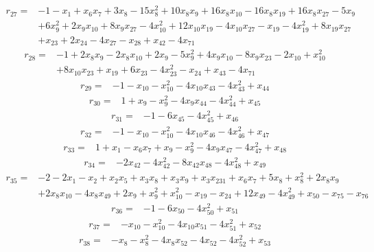 \[\begin{aligned}
r_{27}={}&-1-x_{1}+x_{6}x_{7}+3x_{8}-15x_{8}^{2}+10x_{8}x_{9}+16x_{8}x_{10}-16x_{8}x_{19}+16x_{8}x_{27}-5x_{9}
\\ &+6x_{9}^{2}+2x_{9}x_{10}+8x_{9}x_{27}-4x_{10}^{2}+12x_{10}x_{19}-4x_{10}x_{27}-x_{19}-4x_{19}^{2}+8x_{19}x_{27}
\\ &+x_{23}+2x_{24}-4x_{27}-x_{28}+x_{42}-4x_{71}
\end{aligned}\]
\[\begin{aligned}
r_{28}={}&-1+2x_{8}x_{9}-2x_{8}x_{10}+2x_{9}-5x_{9}^{2}+4x_{9}x_{10}-8x_{9}x_{23}-2x_{10}+x_{10}^{2}
\\ &+8x_{10}x_{23}+x_{19}+6x_{23}-4x_{23}^{2}-x_{24}+x_{43}-4x_{71}
\end{aligned}\]
\[\begin{aligned}
r_{29}={}&-1-x_{10}-x_{10}^{2}-4x_{10}x_{43}-4x_{43}^{2}+x_{44}
\end{aligned}\]
\[\begin{aligned}
r_{30}={}&1+x_{9}-x_{9}^{2}-4x_{9}x_{44}-4x_{44}^{2}+x_{45}
\end{aligned}\]
\[\begin{aligned}
r_{31}={}&-1-6x_{45}-4x_{45}^{2}+x_{46}
\end{aligned}\]
\[\begin{aligned}
r_{32}={}&-1-x_{10}-x_{10}^{2}-4x_{10}x_{46}-4x_{46}^{2}+x_{47}
\end{aligned}\]
\[\begin{aligned}
r_{33}={}&1+x_{1}-x_{6}x_{7}+x_{9}-x_{9}^{2}-4x_{9}x_{47}-4x_{47}^{2}+x_{48}
\end{aligned}\]
\[\begin{aligned}
r_{34}={}&-2x_{42}-4x_{42}^{2}-8x_{42}x_{48}-4x_{48}^{2}+x_{49}
\end{aligned}\]
\[\begin{aligned}
r_{35}={}&-2-2x_{1}-x_{2}+x_{2}x_{5}+x_{3}x_{8}+x_{3}x_{9}+x_{3}x_{231}+x_{6}x_{7}+5x_{8}+x_{8}^{2}+2x_{8}x_{9}
\\ &+2x_{8}x_{10}-4x_{8}x_{49}+2x_{9}+x_{9}^{2}+x_{10}^{2}-x_{19}-x_{24}+12x_{49}-4x_{49}^{2}+x_{50}-x_{75}-x_{76}
\end{aligned}\]
\[\begin{aligned}
r_{36}={}&-1-6x_{50}-4x_{50}^{2}+x_{51}
\end{aligned}\]
\[\begin{aligned}
r_{37}={}&-x_{10}-x_{10}^{2}-4x_{10}x_{51}-4x_{51}^{2}+x_{52}
\end{aligned}\]
\[\begin{aligned}
r_{38}={}&-x_{8}-x_{8}^{2}-4x_{8}x_{52}-4x_{52}-4x_{52}^{2}+x_{53}
\end{aligned}\]
